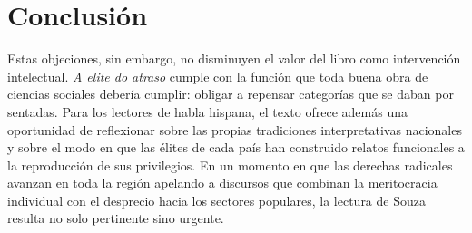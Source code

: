 \documentclass{article}
\begin{document}
\section{Conclusión}
Estas objeciones, sin embargo, no disminuyen el valor del libro como intervención intelectual. \textit{A elite do atraso} cumple con la función que toda buena obra de ciencias sociales debería cumplir: obligar a repensar categorías que se daban por sentadas. Para los lectores de habla hispana, el texto ofrece además una oportunidad de reflexionar sobre las propias tradiciones interpretativas nacionales y sobre el modo en que las élites de cada país han construido relatos funcionales a la reproducción de sus privilegios. En un momento en que las derechas radicales avanzan en toda la región apelando a discursos que combinan la meritocracia individual con el desprecio hacia los sectores populares, la lectura de Souza resulta no solo pertinente sino urgente.
\end{document}
